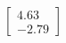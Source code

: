 \documentclass[preview]{standalone}
\begin{document}
\begin{align*}
\begin{bmatrix} 4.63 \\ -2.79 \end{bmatrix}
\end{align*}
\end{document}
